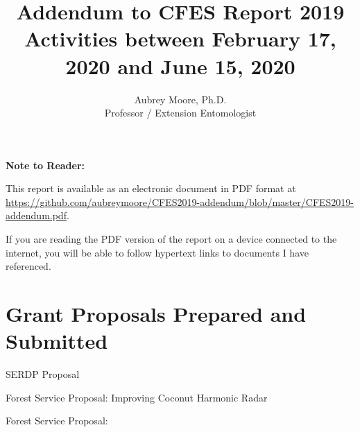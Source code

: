 

\usepackage[breaklinks=true, colorlinks=True, allcolors=blue]{hyperref}

\usepackage{indentfirst} 
\usepackage{comment}

\newcommand{\activities}{\medskip\textbf{Activities}}
\newcommand{\plans}{\medskip\textbf{Plans}}

\makeatletter

\makeatother




\title{Addendum to CFES Report 2019\\ \large{Activities between February 17, 2020 and June 15, 2020}}

\author{Aubrey Moore, Ph.D.\\
Professor / Extension Entomologist}

\maketitle

\setcounter{tocdepth}{2}
\tableofcontents{}

\clearpage

\textbf{Note to Reader:}

This report is available as an electronic document in PDF format at\\
\url{https://github.com/aubreymoore/CFES2019-addendum/blob/master/CFES2019-addendum.pdf}. 

If you are reading the PDF version of the report on a device connected
to the internet, you will be able to follow hypertext links to documents
I have referenced.

\pagebreak

\section{Grant Proposals Prepared and Submitted}
\begin{refsection}
	
SERDP Proposal \cite{moore_serdp_2020-1} 

Forest Service Proposal: Improving Coconut Harmonic Radar \cite{moore_grant_2020}

Forest Service Proposal:\cite{moore_grant_2020-1}

\printbibliography[heading=none]
\end{refsection} 


